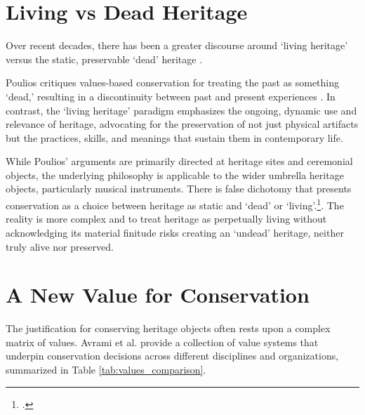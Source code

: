 \section{Living vs Dead Heritage}

Over recent decades, there has been a greater discourse around `living heritage' versus the static, preservable `dead' heritage \cite{poulios_moving_2010,smith_uses_2006}. 

Poulios critiques values-based conservation for treating the past as something `dead,' resulting in a discontinuity between past and present experiences \cite{poulios_moving_2010}. In contrast, the `living heritage' paradigm emphasizes the ongoing, dynamic use and relevance of heritage, advocating for the preservation of not just physical artifacts but the practices, skills, and meanings that sustain them in contemporary life.

While Poulios' arguments are primarily directed at heritage sites and ceremonial objects, the underlying philosophy is applicable to the wider umbrella heritage objects, particularly musical instruments. There is false dichotomy that presents conservation as a choice between heritage as static and `dead' or `living'.\footcite[``a handful dismissed the idea of heritage as a negative idea, noting for instance that heritage was ‘keeping that which aught to be alive dead.''][]{smith_uses_2006}.
The reality is more complex and to treat heritage as perpetually living without acknowledging its material finitude risks creating an `undead' heritage, neither truly alive nor preserved.

\section{A New Value for Conservation}

The justification for conserving heritage objects often rests upon a complex matrix of values. Avrami et al. \citeyear{avrami_values_2000} provide a collection of value systems that underpin conservation decisions across different disciplines and organizations, summarized in Table \ref{tab:values_comparison}.

